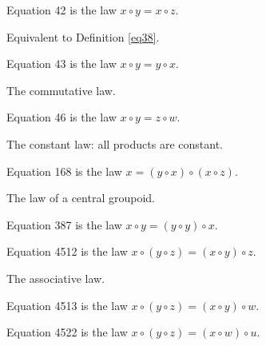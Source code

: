\begin{definition}[Equation 42]\label{eq42}\leanok{}  Equation 42 is the law $x \circ y = x \circ z$.
\end{definition}

Equivalent to Definition \ref{eq38}.

\begin{definition}[Equation 43]\label{eq43}\leanok{}  Equation 43 is the law $x \circ y = y \circ x$.
\end{definition}

The commutative law.

\begin{definition}[Equation 46]\label{eq46}\leanok{}  Equation 46 is the law $x \circ y = z \circ w$.
\end{definition}

The constant law: all products are constant.

\begin{definition}[Equation 168]\label{eq168}\leanok{}  Equation 168 is the law $x = (y \circ x) \circ (x \circ z)$.
\end{definition}

The law of a central groupoid.

\begin{definition}[Equation 387]\label{eq387}\leanok{}  Equation 387 is the law $x \circ y = (y \circ y) \circ x$.
\end{definition}

\begin{definition}[Equation 4512]\label{eq4512}\leanok{}  Equation 4512 is the law $x \circ (y \circ z) = (x \circ y) \circ z$.
\end{definition}

The associative law.

\begin{definition}[Equation 4513]\label{eq4513}\leanok{}  Equation 4513 is the law $x \circ (y \circ z) = (x \circ y) \circ w$.
\end{definition}

\begin{definition}[Equation 4522]\label{eq4522}\leanok{}  Equation 4522 is the law $x \circ (y \circ z) = (x \circ w) \circ u$.
\end{definition}

